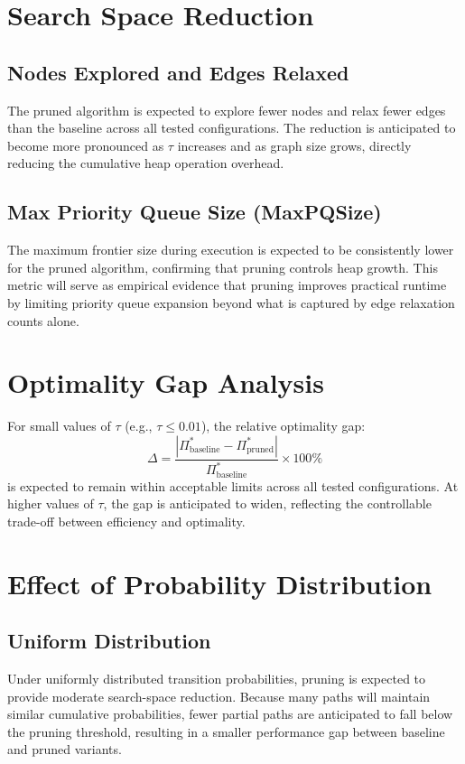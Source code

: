 \section{Search Space Reduction}

\subsection{Nodes Explored and Edges Relaxed}

The pruned algorithm is expected to explore fewer nodes and relax fewer edges than the baseline across all tested configurations. The reduction is anticipated to become more pronounced as $\tau$ increases and as graph size grows, directly reducing the cumulative heap operation overhead.

\subsection{Max Priority Queue Size (MaxPQSize)}

The maximum frontier size during execution is expected to be consistently lower for the pruned algorithm, confirming that pruning controls heap growth. This metric will serve as empirical evidence that pruning improves practical runtime by limiting priority queue expansion beyond what is captured by edge relaxation counts alone.

\section{Optimality Gap Analysis}

For small values of $\tau$ (e.g., $\tau \leq 0.01$), the relative optimality gap:
\[
\Delta = \frac{|\Pi^*_{\text{baseline}} - \Pi^*_{\text{pruned}}|}{\Pi^*_{\text{baseline}}} \times 100\%
\]
is expected to remain within acceptable limits across all tested configurations. At higher values of $\tau$, the gap is anticipated to widen, reflecting the controllable trade-off between efficiency and optimality.

\section{Effect of Probability Distribution}

\subsection{Uniform Distribution}

Under uniformly distributed transition probabilities, pruning is expected to provide moderate search-space reduction. Because many paths will maintain similar cumulative probabilities, fewer partial paths are anticipated to fall below the pruning threshold, resulting in a smaller performance gap between baseline and pruned variants.

